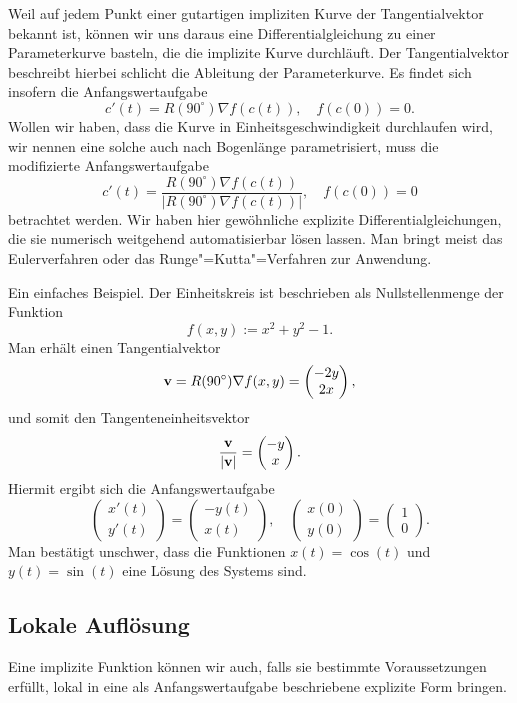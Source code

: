 Weil auf jedem Punkt einer gutartigen impliziten Kurve der
Tangentialvektor bekannt ist, können wir uns daraus eine
Differentialgleichung zu einer Parameterkurve basteln, die die implizite
Kurve durchläuft. Der Tangentialvektor beschreibt hierbei schlicht die
Ableitung der Parameterkurve. Es findet sich insofern die Anfangswertaufgabe
\[c'(t) = R(90^\circ)\nabla f(c(t)),\quad f(c(0))=0.\]
Wollen wir haben, dass die Kurve in Einheitsgeschwindigkeit durchlaufen
wird, wir nennen eine solche auch nach Bogenlänge parametrisiert,
muss die modifizierte Anfangswertaufgabe
\[c'(t) = \frac{R(90^\circ)\nabla f(c(t))}{|R(90^\circ)\nabla f(c(t))|},\quad f(c(0))=0\]
betrachtet werden. Wir haben hier gewöhnliche explizite
Differentialgleichungen, die sie numerisch weitgehend automatisierbar
lösen lassen. Man bringt meist das Eulerverfahren oder das
Runge"=Kutta"=Verfahren zur Anwendung.

Ein einfaches Beispiel. Der Einheitskreis ist beschrieben
als Nullstellenmenge der Funktion
\[f(x,y):=x^2+y^2-1.\]
Man erhält einen Tangentialvektor
\[\mathbf{v} = R(90^\circ)\nabla f(x,y) = \begin{pmatrix}-2y\\ 2x\end{pmatrix},\]
und somit den Tangenteneinheitsvektor
\[\frac{\mathbf{v}}{|\mathbf{v}|} = \begin{pmatrix}-y\\ x\end{pmatrix}.\]
Hiermit ergibt sich die Anfangswertaufgabe
\[\begin{pmatrix}x'(t)\\ y'(t)\end{pmatrix} = 
\begin{pmatrix}-y(t)\\ x(t)\end{pmatrix},\quad
\begin{pmatrix}x(0)\\ y(0)\end{pmatrix} = 
\begin{pmatrix}1\\ 0\end{pmatrix}.\]
Man bestätigt unschwer, dass die Funktionen $x(t)=\cos(t)$ und
$y(t)=\sin(t)$ eine Lösung des Systems sind.

\subsection{Lokale Auflösung}

Eine implizite Funktion können wir auch, falls sie bestimmte
Voraussetzungen erfüllt, lokal in eine als Anfangswertaufgabe
beschriebene explizite Form bringen.

